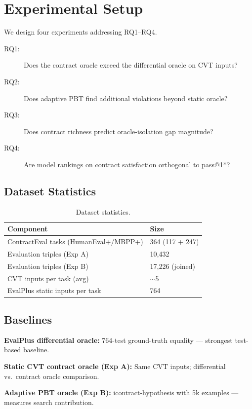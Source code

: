 \section{Experimental Setup}
\label{sec:setup}

We design four experiments addressing RQ1--RQ4.

\begin{description}
\item[RQ1:] Does the contract oracle exceed the differential oracle on CVT inputs?
\item[RQ2:] Does adaptive PBT find additional violations beyond static oracle?
\item[RQ3:] Does contract richness predict oracle-isolation gap magnitude?
\item[RQ4:] Are model rankings on contract satisfaction orthogonal to pass@1*?
\end{description}

\subsection{Dataset Statistics}

\begin{table}[h]
\centering
\small
\caption{Dataset statistics.}
\label{tab:dataset}
\begin{tabular}{ll}
\toprule
Component & Size \\
\midrule
ContractEval tasks (HumanEval+/MBPP+) & 364 (117 + 247) \\
Evaluation triples (Exp A) & 10,432 \\
Evaluation triples (Exp B) & 17,226 (joined) \\
CVT inputs per task (avg) & $\sim$5 \\
EvalPlus static inputs per task & 764 \\
\bottomrule
\end{tabular}
\end{table}

\subsection{Baselines}

\textbf{EvalPlus differential oracle:} 764-test ground-truth equality --- strongest test-based baseline.

\textbf{Static CVT contract oracle (Exp A):} Same CVT inputs; differential vs.\ contract oracle comparison.

\textbf{Adaptive PBT oracle (Exp B):} icontract-hypothesis with 5k examples --- measures search contribution.

